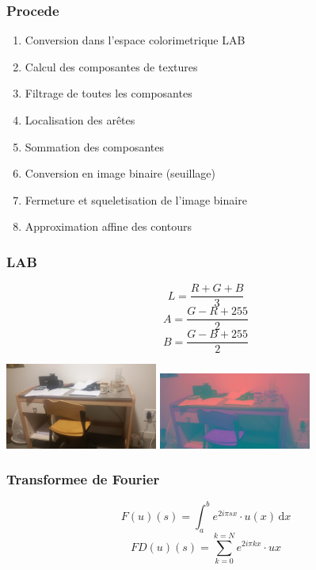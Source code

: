 \documentclass{beamer}
\begin{document}
\begin{frame}
	
	\frametitle{Procede}
	\begin{enumerate}
		\item{Conversion dans l'espace colorimetrique LAB}
		\item{Calcul des composantes de textures}
		\item{Filtrage de toutes les composantes}
		\item{Localisation des arêtes}
		\item{Sommation des composantes}
		\item{Conversion en image binaire (seuillage)}
		\item{Fermeture et squeletisation de l'image binaire}
		\item{Approximation affine des contours}
	\end{enumerate}
	
\end{frame}

\begin{frame}

	\frametitle{LAB}
	$$L = \frac{R + G + B}{3}$$
	$$A = \frac{G - R + 255}{2}$$
	$$B = \frac{G - B + 255}{2}$$

\end{frame}

\begin{frame}

	\includegraphics[width = 5cm]{bureau.png} \includegraphics[width = 5cm]{bureau_lab.jpg}

\end{frame}

\begin{frame}

	\frametitle{Transformee de Fourier}
	$$F(u)(s) = \int_a^b e^{2i\pi sx} \cdot u(x) \, \mathrm dx$$
	$$FD(u)(s) = \sum_{k = 0}^{k = N} e^{2i\pi kx} \cdot u{x}$$

\end{frame}
\end{document}
